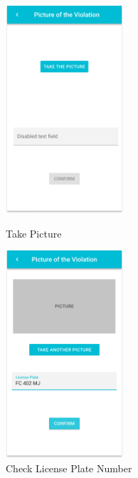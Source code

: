 \documentclass{article}
\begin{document}
\begin{figure}[!htb]
	\centering
	\begin{minipage}{.45\textwidth}
		\centering
		\includegraphics[height=7.7cm,keepaspectratio]{images/mockups/Create_Report_take_picture.png}
		\caption{Take Picture}
	\end{minipage}%
	\begin{minipage}{.45\textwidth}
		\centering
		\includegraphics[height=7.7cm,keepaspectratio]{images/mockups/Create_Report_after_picture.png}
		\caption{Check License Plate Number}
	\end{minipage}
\end{figure}
\end{document}
